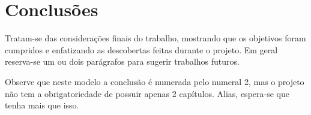 \section{Conclusões}\label{conclusao}


Tratam-se das considerações finais do trabalho, mostrando que os objetivos foram cumpridos e enfatizando as descobertas feitas durante o projeto. Em geral reserva-se um ou dois parágrafos para sugerir trabalhos futuros.

Observe que neste modelo a conclusão é numerada pelo numeral 2, mas o projeto não tem a obrigatoriedade de possuir apenas 2 capítulos. Alias, espera-se que tenha mais que isso.